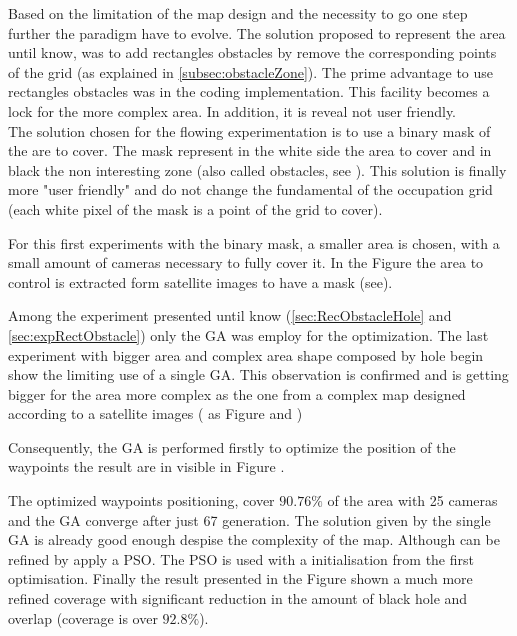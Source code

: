 Based on the limitation of the map design and the necessity to go one step further the paradigm have to evolve.
The solution proposed to represent the area until know, was to add rectangles obstacles by remove the corresponding points of the grid (as explained in \ref{subsec:obstacleZone}). The prime advantage to use rectangles obstacles was in the coding implementation. 
This facility becomes a lock for the more complex area. In addition, it is reveal not user friendly.\\
 The solution chosen for the flowing experimentation is to use a binary mask of the are to cover. The mask represent in the white side the area to cover and in black the non interesting zone (also called obstacles, see ). This solution is finally more "user friendly"  and do not change the fundamental of the occupation grid (each white pixel of the mask is a point of the grid to cover). 
 

For this first experiments with the binary mask, a smaller area is chosen, with a small amount of cameras necessary to fully cover it. In the Figure  the area to control is extracted form satellite images to have a mask (see). 

Among the experiment presented until know (\ref{sec:RecObstacleHole} and \ref{sec:expRectObstacle}) only the GA was employ  for the optimization. The last experiment with bigger area and complex area shape composed by hole begin show the limiting use of a single GA. This observation is confirmed and is getting bigger for the area more complex as the one from a complex map designed according to a satellite images ( as  Figure  and )

Consequently, the GA is performed  firstly to optimize the position of the waypoints the result are in visible in Figure . 

The optimized waypoints positioning, cover $90.76\%$ of the area with 25 cameras and the GA converge after just 67 generation. The solution given by the single GA is already good enough despise the complexity of the map. Although can be refined by apply a PSO. The PSO is used with a initialisation from the first optimisation. 
Finally the result presented in the Figure  shown a much more refined  coverage with significant reduction in the amount of black hole and overlap (coverage is over $92.8\%$). 

